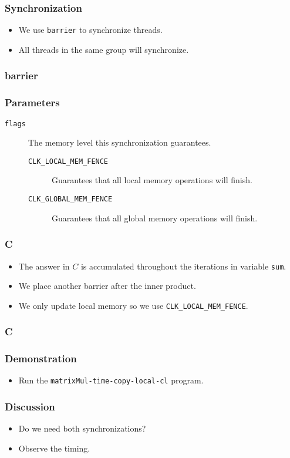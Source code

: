 \documentclass{beamer}
\begin{document}
\begin{frame}
  \frametitle{Synchronization}
  \begin{itemize}
    \item We use {\tt barrier} to synchronize threads.
    \item All threads in the same group will synchronize.
  \end{itemize}
\end{frame}

\begin{frame}
  \frametitle{barrier}
\end{frame}

\begin{frame}
  \frametitle{Parameters}
  \begin{description}
  \item [\tt flags] The memory level this synchronization guarantees.
    \begin{description}
      \item [\tt CLK\_LOCAL\_MEM\_FENCE] Guarantees that all local
        memory operations will finish.
      \item [\tt CLK\_GLOBAL\_MEM\_FENCE] Guarantees that all global
        memory operations will finish.
    \end{description}
  \end{description}
\end{frame}

\begin{frame}
\end{frame}

\begin{frame}
  \frametitle{C}
  \begin{itemize}
    \item The answer in $C$ is accumulated throughout the iterations in
      variable {\tt sum}.
    \item We place another barrier after the inner product.
    \item We only update local memory so we use {\tt CLK\_LOCAL\_MEM\_FENCE}.
  \end{itemize}
\end{frame}

\begin{frame}
  \frametitle{C}
  \centerline{}
\end{frame}

\begin{frame}
  \frametitle{Demonstration}
  \begin{itemize}
    \item Run the {\tt matrixMul-time-copy-local-cl} program.
  \end{itemize}
\end{frame}

\begin{frame}
  \frametitle{Discussion}
  \begin{itemize}
    \item Do we need both synchronizations?
    \item Observe the timing.
  \end{itemize}
\end{frame}
\end{document}
